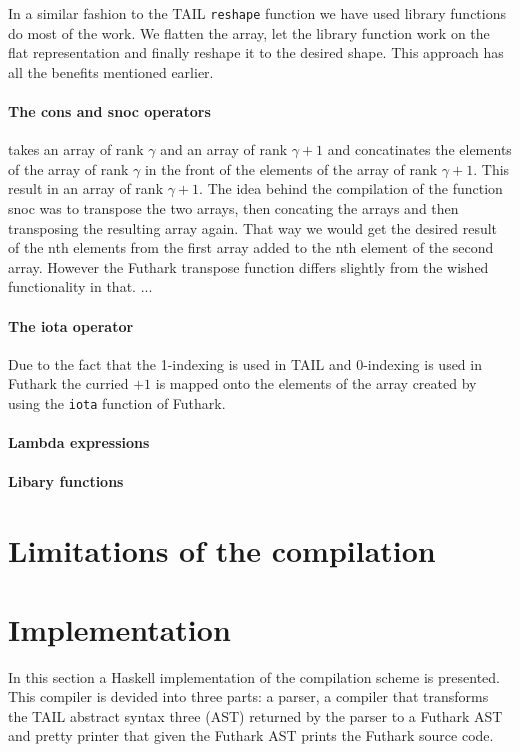 \documentclass[11pt]{article}
\begin{document}
In a similar fashion to the TAIL {\tt reshape} function we have used library functions do most of the work.
We flatten the array, let the library function work on the flat representation and finally reshape it to the desired shape.
This approach has all the benefits mentioned earlier.

\paragraph{The cons and snoc operators} takes an array of rank $\gamma$ and an array of rank $\gamma+1$ and concatinates the elements of the 
array of rank $\gamma$ in the front of the elements of the array of rank $\gamma +1$. This result in an array of rank $\gamma+1$. 
The idea behind the compilation of the function snoc was to transpose the two arrays, then concating the arrays and then transposing the resulting array again. That way we would get the desired result of the nth elements from the first array added to the nth element of the second array. However the Futhark transpose function differs slightly from the wished functionality in that. ...\\

\paragraph{The iota operator} 
Due to the fact that the 1-indexing is used in TAIL and 0-indexing is used in Futhark the curried $+1$ is mapped onto the elements of the array created by using the {\tt iota} function of Futhark. 

\paragraph{Lambda expressions} 

\paragraph{Libary functions}

\section{Limitations of the compilation}
% 

\section{Implementation}
In this section a Haskell implementation of the compilation scheme is presented. This compiler is devided into three parts: a parser, a compiler that transforms the TAIL abstract syntax three (AST) returned by the parser to a Futhark AST and pretty printer that given the Futhark AST prints the Futhark source code. 
\end{document}
